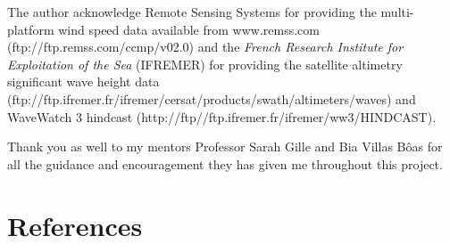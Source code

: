 \documentclass[12pt,twoside]{article}
\begin{document}
The author acknowledge Remote Sensing Systems for providing the multi-platform wind speed data available from www.remss.com (ftp://ftp.remss.com/ccmp/v02.0) and the \textit{French Research Institute for Exploitation of the Sea} (IFREMER) for providing the satellite altimetry significant wave height data (ftp://ftp.ifremer.fr/ifremer/cersat/products/swath/altimeters/waves) and WaveWatch 3 hindcast (http://ftp//ftp.ifremer.fr/ifremer/ww3/HINDCAST). 

Thank you as well to my mentors Professor Sarah Gille and Bia Villas B\^oas for all the guidance and encouragement they has given me throughout this project.

\section*{References}

\noindent {}\\\\
\\\\
\\\\
\\\\
\\\\
\\\\
\\\\
\\\\
\\\\
\\\\
\\\\
\\\\
\\\\
\\\\
\\\\
\end{document}
